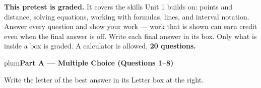 \documentclass[10pt]{article}
\newcommand{\parthead}[1]{%
  \vspace{6pt}\noindent
  \begin{headlinebox}{plum}{\color{white}\bfseries #1}\end{headlinebox}%
  \vspace{4pt}}
\begin{document}

\vspace{0.08in}
\begin{remindbox}
\small
\textbf{This pretest is graded.} It covers the skills Unit 1 builds on: points
and distance, solving equations, working with formulas, lines, and interval
notation. Answer every question and show your work --- work that is shown can
earn credit even when the final answer is off. Write each final answer in its box.
Only what is inside a box is graded. A calculator is allowed.
\textbf{20 questions.}
\end{remindbox}

\boxguard[6]
\parthead{Part A --- Multiple Choice (Questions 1--8)}
Write the letter of the best answer in its Letter box at the right.
\end{document}

